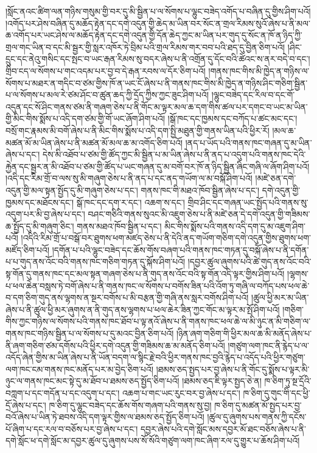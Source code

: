 །སློང་ནའང་ཚིག་ལན་གཉིས་གསུམ་གྱི་བར་དུ་མི་སྦྱིན་པ་ལ་སོགས་པ་ལྷུང་བཟེད་འགོད་པ་བཞིན་དུ་གྱིས་ཤིག་པའོ། །འགོད་པར་ཤེས་བཞིན་དུ་མཆོད་རྟེན་དང་དགེ་འདུན་གྱི་ཆེད་མ་ཡིན་བར་སོང་ན་གྲལ་རིམས་སུའོ་ཞེས་པ་ནི་མལ་ཆ་འགོད་པར་ཡང་ཤེས་ལ་མཆོད་རྟེན་དང་དགེ་འདུན་གྱི་དོན་ཆེད་ཀྱང་མ་ཡིན་པར་གུད་དུ་སོང་ན་ཁོ་ན་ཉིད་ཀྱི་གྲལ་གང་ཡིན་བ་དང་མི་སྦྱར་གྱི་སླར་འཁོར་ཏེ་བྲིམ་པའི་གྲལ་རིམས་གར་བབ་པའི་ཐད་དུ་བྱིན་ཅིག་པའོ། །ཤིང་དྲུང་དང་ནེའུ་གསིང་དང་སྤང་བ་ཡང་རྒན་རིམས་སུ་བདར་ཞེས་པ་ནི་འགྲོན་དུ་དོང་བའི་ཚེའང་ས་ནར་བདེ་བ་དང་། གྲིབ་ངད་ལ་སོགས་པ་གང་འདམ་པར་བྱ་བ་དེ་རྒན་རབས་ལ་དོར་ཅིག་པའོ། །གནས་ཁང་གིས་མི་ཁྱེད་ན་གཉིས་ལ་སོགས་པ་མཐར་ན་གདིང་བ་ཙམ་གྱིས་ཁོ་ན་ཡང་ངོ་ཞེས་པ་ནི་གནས་ཁང་གིས་མི་ཁྱེད་ན་གཉིས་ཤིང་གཅིག་སྦྱིན་པ་ལ་སོགས་པ་མལ་རེ་ཙམ་ཤོང་བ་ཚུན་ཆད་ཀྱི་དྲོད་ཀྱིས་ཀྱང་ཟུང་ཤིག་པའོ། །ལྷུང་བཟེད་དང་རིལ་བ་དང་གོ་འདུན་དང་སོ་ཤིང་གནས་ཙམ་ནི་གཞག་ཅེས་པ་ནི་གོང་མ་ལྟར་མལ་ཆ་དག་གིས་ཚལ་པར་དགང་བ་ཡང་མ་ཡིན་གྱི་མིང་གིས་སྨོས་པ་འདི་དག་ཙམ་གྱི་གོ་ཡང་ཞོག་ཤིག་པའོ། །སྒོ་ཁང་དང་ཁྱམས་དང་བཀོད་པ་ཚང་མང་དང་། བསྲོ་གང་རྣམས་མི་བགོ་ཞེས་པ་ནི་མིང་གིས་སྨོས་པ་འདི་དག་སྤྱི་མཐུན་གྱི་གནས་ཡིན་པའི་ཕྱིར་རོ། །མལ་ཆ་མཚན་མོ་མ་ཡིན་ཞེས་པ་ནི་མཚན་མོ་མལ་ཆ་མ་འགོད་ཅིག་པའོ། །ནད་པ་ཡོད་པའི་གནས་ཁང་གཞན་དུ་མ་ཡིན་ཞེས་པ་དང་། དེས་མི་འཐོབ་པ་ཙམ་གྱི་ཚོད་ཀྱང་མི་སྦྱིན་པ་མ་ཡིན་ཞེས་པ་ནི་ནད་པ་འདུག་པའི་གནས་ཁང་དེའི་རྐྱེན་དང་སྦྱར་ན་མི་འཐོབ་པ་ཙམ་གྱི་ཚོད་པ་ཡང་གཞན་དུ་མ་བགོ་བར་ཁོ་ན་ཉིད་སྦྱིན་ཞིང་གཞི་ལ་ཞོག་ཤིག་པའོ། །འདི་དང་རིམ་གྲོ་བ་ལས་སུ་མི་གཞུག་ཅེས་པ་ནི་ནད་པ་དང་ནད་གཡོག་ལ་མ་བསྐོ་ཤིག་པའོ། །མཛེ་ཅན་དགེ་འདུན་གྱི་མལ་སྟན་སྤྱོད་དུ་མི་གཞུག་ཅེས་པ་དང་། གནས་ཁང་གི་མཐའ་ཁོབ་སྦྱིན་ཞེས་པ་དང་། དགེ་འདུན་གྱི་ཁྱམས་དང་མཐོངས་དང་། སྒོ་ཁང་དང་དག་ར་དང་། འཆག་ས་དང་། གྲིབ་ཤིང་དང་གཞན་ཡང་སྤྱོད་པའི་གནས་སུ་འདུག་པར་མི་བྱ་ཞེས་པ་དང་། བཤང་གཅིའི་གནས་སུའང་མི་འཇུག་ཅེས་པ་ནི་མཛེ་ཅན་དེ་དགེ་འདུན་གྱི་གཟིམས་ཆ་སྤྱོད་དུ་མི་གཞུག་ཅིང་། གནས་མཐའ་ཁོབ་སྦྱིན་པ་དང་། མིང་གིས་སྨོས་པའི་གནས་འདི་དག་དུ་མ་འཇུག་ཤིག་པའོ། །འདིའི་རིམ་གྲོ་པ་བསྒོ་བར་ཐུགས་ཕག་མཛད་ཅེས་པ་ནི་དེའི་ནད་གཡོག་གཅིག་དགེ་འདུན་གྱིས་ཐུགས་ཕག་མཛོད་ཅིག་པའོ། །དགོན་པ་པའི་ལྷུང་བཟེད་དང་ཆོས་གོས་བཞག་པའི་གནས་ཁང་གཏན་དུ་བསྐོ་ཞེས་པ་ནི་དགོན་པ་པ་གུད་ནས་འོང་བའི་གནས་ཁང་གཅིག་གཏན་དུ་སྐོས་ཤིག་པའོ། །དབྱར་ཚུལ་ཞུགས་པའི་ཚེ་གུད་ནས་འོང་བའི་སྟ་གོན་དུ་གནས་ཁང་དང་མལ་སྟན་གཞག་ཅེས་པ་ནི་གུད་ནས་འོང་བའི་སྟ་གོན་འདི་ལྟར་གྱིས་ཤིག་པའོ། །ལྷགས་པ་ཕལ་ཆེན་བསླས་ཏེ་བགོ་ཞེས་པ་ནི་གནས་ཁང་ལ་སོགས་པ་བགོས་ཟིན་པའི་འོག་ཏུ་གཞི་ལ་བཀོད་པས་ཕལ་ཆེ་བ་དག་ཅིག་གུད་ནས་ལྷགས་ན་སྔར་བགོས་པ་མི་བརྩན་གྱི་གཞི་ནས་སླར་བགོས་ཤིག་པའོ། །ཚུལ་ཕྱི་མར་མ་ཡིན་ཞེས་པ་ནི་ཚུལ་ཕྱི་མར་ཞུགས་ན་ནི་གུད་ནས་ལྷགས་པ་ཕལ་ཆེར་ཟིན་ཀྱང་གོང་མ་ལྟར་མ་སྤོ་ཤིག་པའོ། །གཅིག་གིས་ཀྱང་གཉིས་ལ་སོགས་པའི་གནས་ཁང་ཐོབ་པ་ལྟ་ནའོ་ཞེས་པ་ནི་གནས་ཁང་ཕལ་ཆེ་ལ་མི་ཉུང་ན་མི་གཅིག་ལ་གནས་ཁང་གཉིས་སྦྱིན་པ་ལ་སོགས་པ་དུ་མའང་བྱིན་ཅིག་པའོ། །ཉིན་ཞག་གཅིག་གི་ཕྱིར་མལ་ཆ་མི་མནོད་ཞེས་པ་ནི་ཞག་གཅིག་ཙམ་དགོས་པའི་ཕྱིར་དགེ་འདུན་གྱི་གཟིམས་ཆ་མ་མནོད་ཅིག་པའོ། །གཙུག་ལག་ཁང་ནི་རྙེད་པ་ལ་འདོད་ཞེན་གྱིས་མ་ཡིན་ཞེས་པ་ནི་ཡོན་བདག་ལ་སྙིང་རྗེ་བའི་ཕྱིར་གནས་ཁང་བྱའི་རྙེད་པ་འདོད་པའི་ཕྱིར་གཙུག་ལག་ཁང་ངམ་གནས་ཁང་མནོད་པར་མ་བྱེད་ཅིག་པའོ། །ཐམས་ཅད་སྤྱད་པར་བྱ་ཞེས་པ་ནི་གོང་དུ་སྨོས་པ་ལྟར་མི་ཉུང་ལ་གནས་ཁང་མང་སྟེ་དུ་མ་ཐོབ་པ་ཐམས་ཅད་སྤྱོད་ཅིག་པའོ། །ཐམས་ཅད་ཇི་ལྟར་སྤྱད་ཅེ་ན། ཁ་ཅིག་ཏུ་སྔ་དྲོའི་བཀླག་པ་དང་གདོན་པ་དང་འདུག་པ་དང་། འཆག་པ་གང་ཡང་རུང་བར་བྱ་ཞེས་པ་དང་། ཁ་ཅིག་དུ་གུང་གི་དང་ཕྱི་དྲོ་ཞེས་པ་དང་། ཁ་ཅིག་དུ་ལྷུང་བཟེད་དང་ཆོས་གོས་གཞག་པའི་གནས་སུ་བྱ། ཁ་ཅིག་དུ་མཚན་མོ་སྤྱད་པར་བྱ་བའོ་ཞེས་པ་ཡིན་ཏེ་ཐབས་འདི་དག་ལྟར་གྱིས་ལ་ཐམས་ཅད་སྤྱོད་ཅིག་པའོ། །ཚུལ་དུ་ཞུགས་པས་གནས་ཀྱི་དངོས་པོ་ཞིག་པ་དང་རལ་བ་བཅོས་པར་བྱ་ཞེས་པ་དང་། དབྱར་ཞེས་པའི་དགེ་སློང་མས་དབྱར་མོ་ཐང་བཅོས་ཞེས་པ་ནི་དགེ་སློང་ཕ་དགེ་སློང་མ་དབྱར་ཚུལ་དུ་ཞུགས་པས་སོ་སོའི་གཙུག་ལག་ཁང་ཞིག་རལ་དུ་གྱུར་པ་ཆོས་ཤིག་པའོ། 